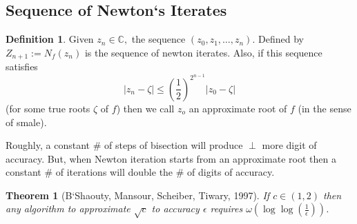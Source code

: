 \documentclass[]{article}
\newtheorem*{theorem}{Theorem}
\theoremstyle{definition}
\newtheorem*{defn}{Definition}
\begin{document}
			\subsection{Sequence of Newton`s Iterates}
			\begin{defn}
			Given $z_n\in\mathbb{C},$ the sequence $(z_0,z_1,\ldots,z_n)$. Defined by $Z_{n+1}:= N_f(z_n)$ is the sequence of newton iterates. Also, if this sequence satisfies
			\[|z_n-\zeta | \leq (\frac{1}{2})^{2^{n-1}} |z_0-\zeta| \]
			(for some true roots $\zeta$ of $f$) then we call $z_o$ an approximate root of $f$ (in the sense of smale).
			\end{defn}
			Roughly, a constant \# of steps of bisection will produce $\perp$ more digit of accuracy. But, when Newton iteration starts from an approximate root then a constant \# of iterations will double the \# of digits of accuracy.
			\begin{theorem}[B`Shaouty, Mansour, Scheiber, Tiwary, 1997] If $c\in(1,2)$ then any algorithm to approximate $\sqrt{c}$ to accuracy $\epsilon$ requires $\omega(\log\log(\frac{1}{\epsilon}))$.
			
			\end{theorem}
			

			

%
%
%
%
%
%
%
%
%
%
%
%
%
%
%			
\end{document}
